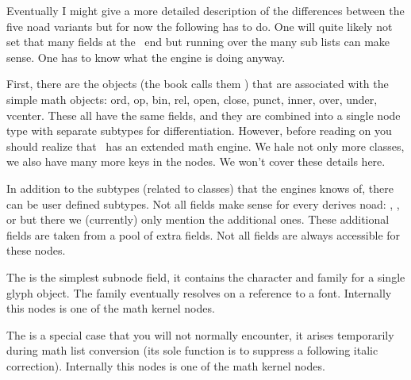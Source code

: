 Eventually I might give a more detailed description of the differences between
the five noad variants but for now the following has to do. One will quite likely
not set that many fields at the \LUA\ end but running over the many sub lists can
make sense. One has to know what the engine is doing anyway.

\stopsubsection

\startsubsection[title=noad]

First, there are the objects (the \TEX book calls them ) that are
associated with the simple math objects: ord, op, bin, rel, open, close, punct,
inner, over, under, vcenter. These all have the same fields, and they are
combined into a single node type with separate subtypes for differentiation.
However, before reading on you should realize that \LUAMETATEX\ has an extended
math engine. We hale not only more classes, we also have many more keys in the
nodes. We won't cover these details here.


In addition to the subtypes (related to classes) that the engines knows of, there
can be user defined subtypes. Not all fields make sense for every derives noad:
, ,  or  but there we
(currently) only mention the additional ones. These additional fields are taken
from a pool of extra fields. Not all fields are always accessible for these nodes.


\stopsubsection

\startsubsection[title=mathchar]

The  is the simplest subnode field, it contains the character and
family for a single glyph object. The family eventually resolves on a reference
to a font. Internally this nodes is one of the math kernel nodes.



\stopsubsection

\startsubsection[title=mathtextchar]

The  is a special case that you will not normally encounter,
it arises temporarily during math list conversion (its sole function is to
suppress a following italic correction). Internally this nodes is one of the math
kernel nodes.

